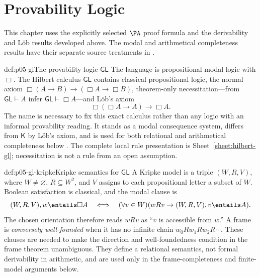 \chapter{Provability Logic}\label{sec:p05-provability-logic}

This chapter uses the explicitly selected \(\PA\) proof formula and the
derivability and L\"ob results developed above. The modal and arithmetical
completeness results have their separate source treatments in
\cite{Segerberg1971,Solovay1976,Boolos1993}.

\begin{hbdefinition}{def:p05-gl}{The provability logic \(\mathsf{GL}\)}
The language is propositional modal logic with \(\Box\).  The Hilbert calculus
\(\mathsf{GL}\) contains classical propositional logic, the normal axiom
\(\Box(A\to B)\to(\Box A\to\Box B)\), theorem-only necessitation---from
\(\mathsf{GL}\vdash A\) infer \(\mathsf{GL}\vdash\Box A\)---and L\"ob's axiom
\[
 \Box(\Box A\to A)\to\Box A.
\]
The name is necessary to fix this exact calculus rather than any logic with an
informal provability reading.  It stands as a modal consequence system,
differs from \(\mathsf K\) by L\"ob's axiom, and is used for both relational
and arithmetical completeness below \cite{Segerberg1971,Boolos1993}.  The
complete local rule presentation is Sheet~\ref{sheet:hilbert-gl};
necessitation is not a rule from an open assumption.
\end{hbdefinition}

\begin{hbdefinition}{def:p05-gl-kripke}{Kripke semantics for \(\mathsf{GL}\)}
A Kripke model is a triple \((W,R,V)\), where \(W\ne\varnothing\),
\(R\subseteq W^2\), and \(V\) assigns to each propositional letter a subset
of \(W\).  Boolean satisfaction is classical, and the modal clause is
\[
 (W,R,V),w\entails\Box A
 \quad\Longleftrightarrow\quad
 (\forall v\in W)(wRv\to(W,R,V),v\entails A).
\]
The chosen orientation therefore reads \(wRv\) as “\(v\) is accessible from
\(w\).”  A frame is \emph{conversely well-founded} when it has no infinite
chain \(w_0Rw_1Rw_2R\cdots\).  These clauses are needed to make the direction
and well-foundedness condition in the frame theorem unambiguous.  They define
a relational semantics, not formal derivability in arithmetic, and are used
only in the frame-completeness and finite-model arguments below.
\end{hbdefinition}

